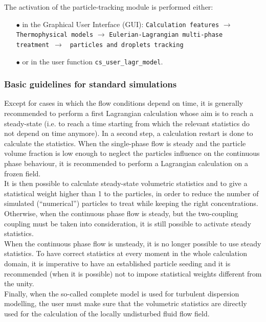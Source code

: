 {{{The activation of the particle-tracking module is performed either:
%
\begin{itemize}
 \item [$\bullet$] in the Graphical User Interface (GUI): \texttt{Calculation features} $\rightarrow$ \texttt{Thermophysical models} $\rightarrow$ \texttt{Eulerian-Lagrangian multi-phase treatment}~$\rightarrow$ ~\texttt{particles and droplets tracking}
 \item [$\bullet$] or in the user function \texttt{cs\_user\_lagr\_model}.
\end{itemize}

\subsubsection{Basic guidelines for standard simulations}

Except for cases in which the flow conditions depend on time, it is generally recommended to perform a first Lagrangian calculation whose aim is to reach a steady-state (i.e. to reach a time starting from which the relevant statistics do not depend on time anymore). In a second step, a calculation restart is done to calculate the statistics. When the single-phase flow is steady and the particle volume fraction is low enough to neglect the particles influence on the continuous phase behaviour, it is recommended to perform a Lagrangian calculation on a frozen field.\\

It is then possible to calculate steady-state volumetric statistics and to give a statistical weight higher than 1 to the particles, in order to reduce the number of simulated (``numerical'') particles to treat while keeping the right concentrations. Otherwise, when the continuous phase flow is steady, but the two-coupling coupling must be taken into consideration, it is still possible to activate steady statistics. \\
When the continuous phase flow is unsteady, it is no longer possible to use steady statistics. To have correct statistics at every moment in the whole calculation domain, it is imperative to have an established particle seeding and it is recommended (when it is possible) not to impose statistical weights different from the unity. \\

Finally, when the so-called complete model is used for turbulent dispersion modelling, the user must make sure that the volumetric statistics are directly used for the calculation of the locally undisturbed fluid flow field.\\

}}}
